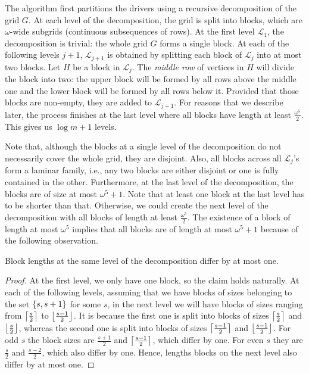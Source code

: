 \newcommand{\MaxGadgetDepth}{\frac{\omega^5}{4}}
\newcommand{\TwoMaxGadgetDepth}{\frac{\omega^5}{2}}
\newcommand{\FourMaxGadgetDepth}{\omega^5}

\label{sec:decomp}

The algorithm first partitions the drivers using a recursive decomposition of the grid $G$.
At each level of the decomposition, the grid is split into blocks, which are $\omega$-wide subgrids (continuous subsequences of rows).
At the first level $\mathcal{L}_1$, the decomposition is trivial: the whole grid $G$ forms a single block.
At each of the following levels $j+1$, $\mathcal{L}_{j+1}$ is obtained by splitting each block of $\mathcal{L}_j$ into at most two blocks.
Let $H$ be a block in $\mathcal{L}_j$.
The \emph{middle row} of vertices in $H$ will divide the block into two:
the upper block will be formed by all rows above the middle one
and the lower block will be formed by all rows below it.
Provided that those blocks are non-empty, they are added to $\mathcal{L}_{j+1}$.
For reasons that we describe later, the process finishes at the last level where all blocks have length at least
$\TwoMaxGadgetDepth$.
This gives us $\log m + 1$ levels.

Note that, although the blocks at a single level of the decomposition do not necessarily cover the whole grid, they are disjoint.
Also, all blocks across all $\mathcal{L}_j$'s form a laminar family, i.e., any two blocks are either disjoint or one is fully contained in the other.
Furthermore, at the last level of the decomposition, the blocks are of size at most $\FourMaxGadgetDepth + 1$.
Note that at least one block at the last level has to be shorter than that.
Otherwise, we could create the next level of the decomposition with all blocks of length at least $\TwoMaxGadgetDepth$.
The existence of a block of length at most $\FourMaxGadgetDepth$ implies that all blocks are of length at most $\FourMaxGadgetDepth + 1$
because of the following observation.

\begin{remark}
Block lengths at the same level of the decomposition differ by at most one.
\end{remark}
\begin{proof}
At the first level, we only have one block, so the claim holds naturally.
At each of the following levels, assuming that we have blocks of sizes belonging to the set $\left\{ s, s+1 \right\}$ for some $s$,
in the next level we will have blocks of sizes ranging from $\left\lceil \frac{s}{2} \right\rceil$ to $\left\lfloor \frac{s-1}{2} \right\rfloor$.
It is because the first one is split into blocks of sizes $\left\lceil \frac{s}{2} \right\rceil$ and $\left\lfloor \frac{s}{2} \right\rfloor$,
whereas the second one is split into blocks of sizes $\left\lceil \frac{s-1}{2} \right\rceil$ and $\left\lfloor \frac{s-1}{2} \right\rfloor$.
For odd $s$ the block sizes are $\frac{s+1}{2}$ and $\left\lceil \frac{s-1}{2} \right\rceil$, which differ by one.
For even $s$ they are $\frac{s}{2}$ and $\frac{s-2}{2}$, which also differ by one.
Hence, lengths blocks on the next level also differ by at most one.
\end{proof}

